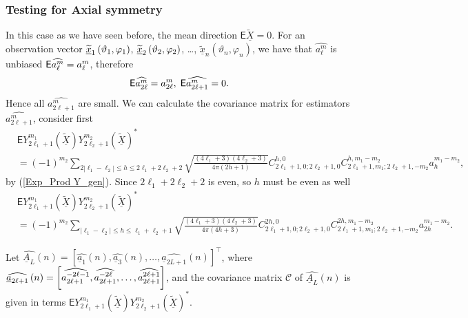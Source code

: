 \documentclass[preprint,11pt,a4paper]{elsarticle}
\begin{document}
\subsubsection{Testing for Axial symmetry}

In this case as we have seen before, the mean direction $\mathsf{E}%
\underline{\widetilde{X}}=0$. For an observation vector $\underline{%
\widetilde{x}}_{1}\left( \vartheta_{1},\varphi_{1}\right) $, $\underline{%
\widetilde{x}}_{2}\left( \vartheta_{2},\varphi_{2}\right) $, \ldots, $%
\underline{\widetilde{x}}_{n}\left( \vartheta_{n},\varphi _{n}\right) $, we
have that $\widehat{a_{\ell}^{m}}$ is unbiased $\mathsf{E}\widehat{%
a_{\ell}^{m}}=a_{\ell}^{m}$, therefore 
\begin{equation*}
\mathsf{E}\widehat{a_{2\ell}^{m}}=a_{2\ell}^{m},\;\mathsf{E}\widehat{%
a_{2\ell +1}^{m}}=0.
\end{equation*}
Hence all $\widehat{a_{2\ell+1}^{m}}$ are small. We can calculate the
covariance matrix for estimators $\widehat{a_{2\ell+1}^{m}}$, consider first 
\begin{align*}
& \mathsf{E}Y_{2\ell_{1}+1}^{m_{1}}\left( \underline{\widetilde{X}}\right)
Y_{2\ell_{2}+1}^{m_{2}}\left( \underline{\widetilde{X}}\right) ^{\ast} \\
& =\left( -1\right) ^{m_{2}}\sum_{2\left\vert \ell_{1}-\ell_{2}\right\vert
\leq h\leq2\ell_{1}+2\ell_{2}+2}\sqrt{\frac{\left( 4\ell_{1}+3\right) \left(
4\ell_{2}+3\right) }{4\pi\left( 2h+1\right) }}C_{2\ell
_{1}+1,0;2\ell_{2}+1,0}^{h,0}C_{2\ell_{1}+1,m_{1};2%
\ell_{2}+1,-m_{2}}^{h,m_{1}-m_{2}}a_{h}^{m_{1}-m_{2}},
\end{align*}
by (\ref{Exp_Prod Y_gen}). Since $2\ell_{1}+2\ell_{2}+2$ is even, so $h$
must be even as well%
\begin{align*}
& \mathsf{E}Y_{2\ell_{1}+1}^{m_{1}}\left( \underline{\widetilde{X}}\right)
Y_{2\ell_{2}+1}^{m_{2}}\left( \underline{\widetilde{X}}\right) ^{\ast} \\
& =\left( -1\right) ^{m_{2}}\sum_{\left\vert \ell_{1}-\ell_{2}\right\vert
\leq h\leq\ell_{1}+\ell_{2}+1}\sqrt{\frac{\left( 4\ell_{1}+3\right) \left(
4\ell_{2}+3\right) }{4\pi\left( 4h+3\right) }}C_{2\ell_{1}+1,0;2\ell
_{2}+1,0}^{2h,0}C_{2\ell_{1}+1,m_{1};2%
\ell_{2}+1,-m_{2}}^{2h,m_{1}-m_{2}}a_{2h}^{m_{1}-m_{2}}.
\end{align*}

Let $\widehat{\underline{A}_{L}}\left( n\right) =\left[ \widehat{\underline{a%
}_{1}}\left( n\right) ,\widehat{\underline{a}_{3}}\left( n\right) ,\ldots,%
\widehat{\underline{a}_{2L+1}}\left( n\right) \right] ^{\top}$, where $%
\widehat{\underline{a}_{2\ell+1}}\left( n\right) =\left[ \widehat{%
a_{2\ell+1}^{-2\ell-1}},\widehat{a_{2\ell+1}^{-2\ell}},\ldots,\widehat{%
a_{2\ell+1}^{2\ell+1}}\right] $, and the covariance matrix $\mathcal{C}$ of $%
\widehat{\underline{A}_{L}}\left( n\right) $ is given in terms $\mathsf{E}%
Y_{2\ell_{1}+1}^{m_{1}}\left( \underline{\widetilde{X}}\right)
Y_{2\ell_{2}+1}^{m_{2}}\left( \underline{\widetilde{X}}\right) ^{\ast}$.
\end{document}
